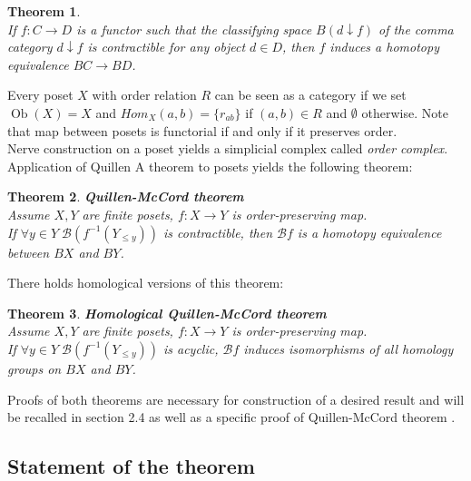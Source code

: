 \documentclass[a4paper, 12pt]{article}
\newtheorem{theorem}{Theorem}
\theoremstyle{definition}
\theoremstyle{remark}
\newcommand{\define}[1]{{\textit{#1}}}
\begin{document}
\begin{theorem} {\cite[Theorem A]{Quillen72}}\\
  If $f: C \to D$ is a functor such that the classifying space $B(d \downarrow f)$ of the comma category $d \downarrow f$ is contractible for any object $d \in D$, then $f$ induces a homotopy equivalence $BC \to BD$.
\end{theorem}

Every poset $X$ with order relation $R$ can be seen as a category if we set $\operatorname{Ob}(X) = X$ and $Hom_X(a,b) = \{r_{ab}\}$ if $(a,b) \in R$ and $\emptyset$ otherwise. Note that map between posets is functorial if and only if it preserves order.\\
Nerve construction on a poset yields a simplicial complex called \define{order complex}. Application of Quillen A theorem to posets yields the following theorem:

\begin{theorem} \textbf{Quillen-McCord theorem}\\
  Assume $X, Y$ are finite posets, $f : X \to Y$ is order-preserving map.\\
  If $\forall y \in Y\;\mathcal{B}(f^{-1}(Y_{\leqslant y}))$ is contractible, then $\mathcal{B}f$ is a homotopy equivalence between $BX$ and $BY$.\\
\end{theorem}

There holds homological {\cite[Corollary 5.5]{Bar11}} versions of this theorem:

\begin{theorem} \textbf{Homological Quillen-McCord theorem}\\
  Assume $X, Y$ are finite posets, $f : X \to Y$ is order-preserving map.\\
  If $\forall y \in Y\;\mathcal{B}(f^{-1}(Y_{\leqslant y}))$ is acyclic, $\mathcal{B}f$ induces isomorphisms of all homology groups on $BX$ and $BY$.\\
\end{theorem}

Proofs of both theorems are necessary for construction of a desired result and will be recalled in section 2.4 as well as a specific proof of Quillen-McCord theorem {\cite[Proof of Theorem 1.1]{Bar11}}.\\

\subsection{Statement of the theorem}
\end{document}
